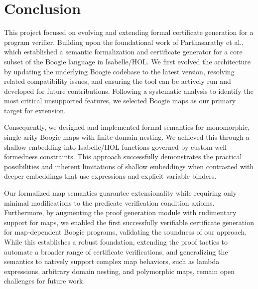 \chapter{Conclusion}
\label{sec:conclusion}

This project focused on evolving and extending formal certificate generation for a program verifier.
Building upon the foundational work of Parthasarathy et al.,
which established a semantic formalization and certificate generator for a core subset of the Boogie language in Isabelle/HOL.
We first evolved the architecture by updating the underlying Boogie codebase to the latest version, resolving related compatibility issues, and ensuring the tool can be actively run and developed for future contributions.
Following a systematic analysis to identify the most critical unsupported features, we selected Boogie maps as our primary target for extension.

Consequently, we designed and implemented formal semantics for monomorphic, single-arity Boogie maps with finite domain nesting.
We achieved this through a shallow embedding into Isabelle/HOL functions governed by custom well-formedness constraints.
This approach successfully demonstrates the practical possibilities
and inherent limitations of shallow embeddings when contrasted
with deeper embeddings that use expressions and explicit variable binders.

Our formalized map semantics guarantee extensionality while requiring only minimal modifications to the predicate verification condition axioms.
Furthermore, by augmenting the proof generation module with rudimentary support for maps,
we enabled the first successfully verifiable certificate generation for map-dependent Boogie programs, validating the soundness of our approach.
While this establishes a robust foundation, extending the proof tactics to automate a broader range of certificate verifications,
and generalizing the semantics to natively support complex map behaviors,
such as lambda expressions, arbitrary domain nesting, and polymorphic maps, remain open challenges for future work.